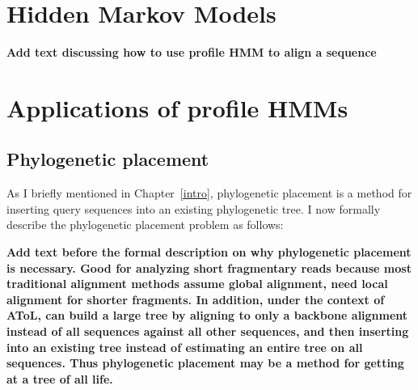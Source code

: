 
\section{Hidden Markov Models}\label{back:hmm}

\textbf{Add text discussing how to use profile HMM to align a sequence}
\section{Applications of profile HMMs}\label{back:app}
\subsection{Phylogenetic placement}
As I briefly mentioned in Chapter~\ref{intro}, phylogenetic placement is a method for inserting query sequences into an existing phylogenetic tree.  I now formally describe the phylogenetic placement problem as follows:

\textbf{Add text before the formal description on why phylogenetic placement is necessary.  Good for analyzing short fragmentary reads because most traditional alignment methods assume global alignment, need local alignment for shorter fragments.  In addition, under the context of AToL, can build a large tree by aligning to only a backbone alignment instead of all sequences against all other sequences, and then inserting into an existing tree instead of estimating an entire tree on all sequences.  Thus phylogenetic placement may be a method for getting at a tree of all life.}

